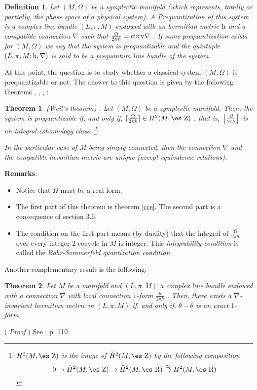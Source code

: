 \documentclass[12pt]{article}
\newtheorem{teor}{Theorem}
\newtheorem{definition}{Definition}
\def\dst{\(}
\def\proof{( {\it Proof} )\quad}
\def\map#1{\mathrel{\mathop{\to}\limits^{#1}}}
\def\qed{\ifvmode\removelastskip\fi
{\unskip\nobreak\hfil\penalty50\hbox{}\nobreak\hfil
\hbox{\vrule height1.2ex width1.2ex}\parfillskip=0pt
\finalhyphendemerits=0 \par\smallskip}}
\def\h{{\rm h}}
\def\Zahl{\mbox{\es Z}}
\def\Real{\mbox{\es R}}
\begin{document}
\begin{definition}
Let $(M,\Omega )$ be a symplectic manifold
(which represents, totally or partially,
the phase space of a physical system).
A {\rm Prequantization} of this system is a complex line bundle
$(L,\pi ,M)$ endowed with an hermitian metric $\h$
and a compatible connection $\nabla$ such that
\dst\frac{\Omega}{2\pi\hbar} = {\rm curv} \nabla\) .
If some prequantization exists for $(M,\Omega )$
we say that the system is {\rm prequantizable}
and the quintuple $(L,\pi ,M;\h ,\nabla )$
is said to be a {\rm prequantum line bundle} of the system.
\label{prequan}
\end{definition}

At this point, the question is
to study whether a classical system $(M,\Omega )$ is prequantizable or
not.
The answer to this question is given
by the following theorems
\cite{AM-78}, \cite{Ko-70}, \cite{SW-76}, \cite{Sn-80}:

\begin{teor}
{\rm (Weil's theorem) \cite{We-58}}.
Let $(M,\Omega )$ be a symplectic manifold.
Then, the system is prequantizable
if, and only if, \dst[\frac{\Omega}{2\pi\hbar}] \in H^2(M,\Zahl )\) ,
that is, \dst[\frac{\Omega}{2\pi\hbar}]\)
is an {\it integral cohomology class}.%
\footnote{
$H^2(M,\Zahl )$ is the image of $\check H^2(M,\Zahl )$
by the following composition
$$
0 \to \check H^2(M,\Zahl ) \to \check H^2(M,\Real ) \map{\simeq}
H^2(M,\Real)
$$
}

In the particular case of $M$ being simply connected,
then the connection $\nabla$ and the compatible hermitian metric
are unique (except equivalence relations).
\label{weil}
\end{teor}

{\bf Remarks}:
\begin{itemize}
\item
Notice that $\Omega$ must be a real form.
\item
The first part of this theorem is theorem \ref{cce}.
The second part is a consequence of section 3.6.
\item
The condition on the first part means (by duality) that the
integral of \dst\frac{\Omega}{2\pi\hbar}\) over every integer
$2$-cocycle in $M$ is integer. This {\it integrability condition}
is called the {\it Bohr-Sommerfeld quantization condition}.
\end{itemize}

Another complementary result is the following:

\begin{teor}
Let $M$ be a manifold and
$(L,\pi ,M)$ a complex line bundle
endowed with a connection $\nabla$
with local connection $1$-form \dst\frac{\theta}{2\pi\hbar}\) .
Then, there exists a $\nabla$-invariant
hermitian metric in $(L,\pi ,M)$
if, and only if, $\theta -\bar \theta$ is an exact $1$-form.
\label{ihm}
\end{teor}
\proof
See \cite{Ko-70}, p. 110.
\qed
\end{document}
